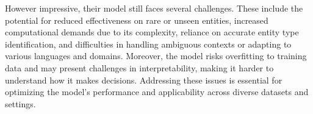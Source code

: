 However impressive, their model still faces several challenges. These include the potential for reduced effectiveness on rare or unseen entities, increased computational demands due to its complexity, reliance on accurate entity type identification, and difficulties in handling ambiguous contexts or adapting to various languages and domains. Moreover, the model risks overfitting to training data and may present challenges in interpretability, making it harder to understand how it makes decisions. Addressing these issues is essential for optimizing the model's performance and applicability across diverse datasets and settings.